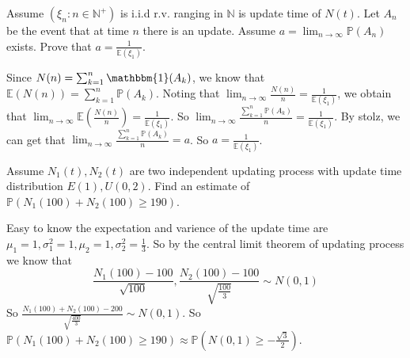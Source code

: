 \documentclass[../main]{subfiles}
\begin{document}
\begin{problem}\label{pro:4}
  Assume \((\xi_n:n \in \mathbb{N}^+)\) is i.i.d r.v. ranging in \(\mathbb{N}\) is update time of \(N(t)\).
  Let \(A_n\) be the event that at time \(n\) there is an update.
  Assume \(a=\lim_{n \to \infty}\mathbb{P}(A_n)\) exists.
  Prove that \(a=\frac{1}{\mathbb{E}(\xi_1)}\).
\end{problem}
\begin{solution}
  Since \(N(n)=\sum_{k=1}^{n} \mathbbm{1}(A_k)\), we know that \(\mathbb{E}(N(n))=\sum_{k=1}^{n} \mathbb{P}(A_k)\).
  Noting that \(\lim_{n \to \infty}\frac{N(n)}{n}=\frac{1}{\mathbb{E}(\xi_1)}\), we obtain that \(\lim_{n \to \infty}\mathbb{E}(\frac{N(n)}{n})=\frac{1}{\mathbb{E}(\xi_1)}\).
  So \(\lim_{n \to \infty}\frac{\sum_{k=1}^{n} \mathbb{P}(A_k)}{n}=\frac{1}{\mathbb{E}(\xi_1)}\).
  By stolz, we can get that \(\lim_{n \to \infty}\frac{\sum_{k=1}^{n} \mathbb{P}(A_k)}{n}=a\).
  So \(a=\frac{1}{\mathbb{E}(\xi_1)}\).
\end{solution}
\begin{problem}\label{pro:5}
  Assume \(N_1(t),N_2(t)\) are two independent updating process with update time distribution
  \(E(1),U(0,2)\).
  Find an estimate of \(\mathbb{P}(N_1(100)+N_2(100) \geq 190)\).
\end{problem}
\begin{solution}
  Easy to know the expectation and varience of the update time are \(\mu_1=1,\sigma_1^2=1,\mu_2=1,\sigma_2^2=\frac{1}{3}\).
  So by the central limit theorem of updating process we know that
  \[
    \frac{N_1(100)-100}{\sqrt{100}},\frac{N_2(100)-100}{\sqrt{\frac{100}{3}}} \sim N(0,1)
  \]
  So \(\frac{N_1(100)+N_2(100)-200}{\sqrt{\frac{400}{3}}} \sim N(0,1)\).
  So \(\mathbb{P}(N_1(100)+N_2(100)\geq 190)\approx \mathbb{P}(N(0,1) \geq -\frac{\sqrt{3}}{2})\).
\end{solution}
\end{document}

